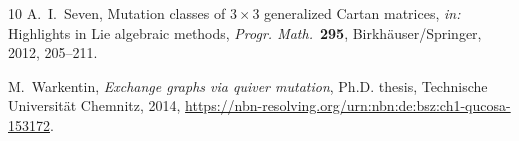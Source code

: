 \documentclass[11pt, letterpaper]{amsart}
\theoremstyle{definition}
\numberwithin{equation}{section}
\begin{document}
\begin{thebibliography}{10}
A.~I.~Seven, %
Mutation classes of {$3\times3$} generalized {C}artan matrices, 
\emph{in:} Highlights in {L}ie algebraic methods, \emph{Progr. Math.}\ \textbf{295},
  Birkh\"{a}user/Springer, 2012, 205--211. %
 
M.~Warkentin,  %
\emph{Exchange graphs via quiver mutation}, 
Ph.D. thesis, 
Technische Universit\"at Chemnitz, %
2014, 
\url{https://nbn-resolving.org/urn:nbn:de:bsz:ch1-qucosa-153172}.

\end{thebibliography}


%
%
\end{document}
